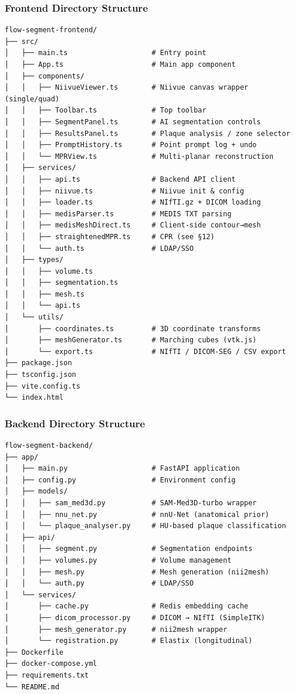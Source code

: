\documentclass[
  11pt,
]{article}
\begin{document}
\subsubsection{Frontend Directory
Structure}\label{frontend-directory-structure}

\begin{verbatim}
flow-segment-frontend/
├── src/
│   ├── main.ts                    # Entry point
│   ├── App.ts                     # Main app component
│   ├── components/
│   │   ├── NiivueViewer.ts        # Niivue canvas wrapper (single/quad)
│   │   ├── Toolbar.ts             # Top toolbar
│   │   ├── SegmentPanel.ts        # AI segmentation controls
│   │   ├── ResultsPanel.ts        # Plaque analysis / zone selector
│   │   ├── PromptHistory.ts       # Point prompt log + undo
│   │   └── MPRView.ts             # Multi-planar reconstruction
│   ├── services/
│   │   ├── api.ts                 # Backend API client
│   │   ├── niivue.ts              # Niivue init & config
│   │   ├── loader.ts              # NIfTI.gz + DICOM loading
│   │   ├── medisParser.ts         # MEDIS TXT parsing
│   │   ├── medisMeshDirect.ts     # Client-side contour→mesh
│   │   ├── straightenedMPR.ts     # CPR (see §12)
│   │   └── auth.ts                # LDAP/SSO
│   ├── types/
│   │   ├── volume.ts
│   │   ├── segmentation.ts
│   │   ├── mesh.ts
│   │   └── api.ts
│   └── utils/
│       ├── coordinates.ts         # 3D coordinate transforms
│       ├── meshGenerator.ts       # Marching cubes (vtk.js)
│       └── export.ts              # NIfTI / DICOM-SEG / CSV export
├── package.json
├── tsconfig.json
├── vite.config.ts
└── index.html
\end{verbatim}

\subsubsection{Backend Directory
Structure}\label{backend-directory-structure}

\begin{verbatim}
flow-segment-backend/
├── app/
│   ├── main.py                    # FastAPI application
│   ├── config.py                  # Environment config
│   ├── models/
│   │   ├── sam_med3d.py           # SAM-Med3D-turbo wrapper
│   │   ├── nnu_net.py             # nnU-Net (anatomical prior)
│   │   └── plaque_analyser.py     # HU-based plaque classification
│   ├── api/
│   │   ├── segment.py             # Segmentation endpoints
│   │   ├── volumes.py             # Volume management
│   │   ├── mesh.py                # Mesh generation (nii2mesh)
│   │   └── auth.py                # LDAP/SSO
│   └── services/
│       ├── cache.py               # Redis embedding cache
│       ├── dicom_processor.py     # DICOM → NIfTI (SimpleITK)
│       ├── mesh_generator.py      # nii2mesh wrapper
│       └── registration.py        # Elastix (longitudinal)
├── Dockerfile
├── docker-compose.yml
├── requirements.txt
└── README.md
\end{verbatim}
\end{document}

